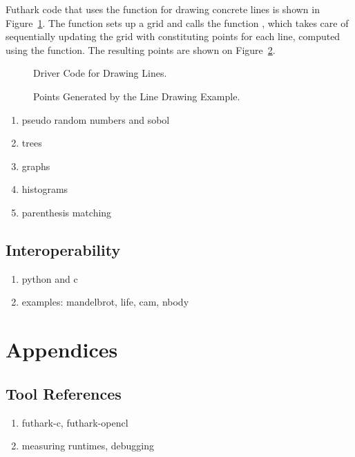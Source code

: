 \documentclass[oneside,11pt]{book}
\begin{document}
Futhark code that uses the  function for drawing
concrete lines is shown in Figure~\ref{fig:linesdriver}. The function
 sets up a grid and calls the function , which
takes care of sequentially updating the grid with constituting points
for each line, computed using the  function. The
resulting points are shown on Figure~\ref{fig:lines}.

\begin{figure}
  
  \caption{Driver Code for Drawing Lines.}
  \label{fig:linesdriver}
\end{figure}

\begin{figure}
  \begin{center}

  \end{center}
\caption{Points Generated by the Line Drawing Example.}
\label{fig:lines}
\end{figure}

\begin{enumerate}
\item pseudo random numbers and sobol
\item trees
\item graphs
\item histograms
\item parenthesis matching
\end{enumerate}


\chapter{Interoperability}
\label{chap:interoperability}

\begin{enumerate}
\item python and c
\item examples: mandelbrot, life, cam, nbody
\end{enumerate}




\appendix

\part{Appendices}

\chapter{Tool References}
\begin{enumerate}
\item futhark-c, futhark-opencl
\item measuring runtimes, debugging
\end{enumerate}
\end{document}
